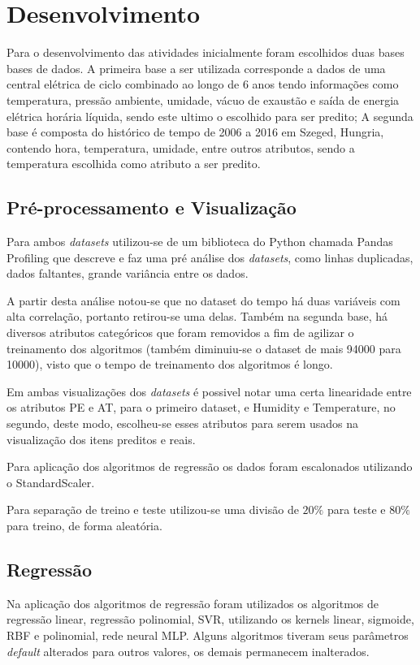 \chapter{Desenvolvimento}\label{cap_desenv}

Para o desenvolvimento das atividades inicialmente foram escolhidos duas bases bases de dados. A primeira base a ser utilizada corresponde a dados de uma central elétrica de ciclo combinado ao longo de 6 anos tendo informações como temperatura, pressão ambiente, umidade, vácuo de exaustão e saída de energia elétrica horária líquida, sendo este ultimo o escolhido para ser predito; A segunda base é composta do histórico de tempo de 2006 a 2016 em Szeged, Hungria, contendo hora, temperatura, umidade, entre outros atributos, sendo a temperatura escolhida como atributo a ser predito.

\section{Pré-processamento e Visualização}
Para ambos \textit{datasets} utilizou-se de um biblioteca do Python chamada Pandas Profiling que descreve e faz uma pré análise dos \textit{datasets}, como linhas duplicadas, dados faltantes, grande variância entre os dados.

A partir desta análise notou-se que no dataset do tempo há duas variáveis com alta correlação, portanto retirou-se uma delas. Também na segunda base, há diversos atributos categóricos que foram removidos a fim de agilizar o treinamento dos algoritmos (também diminuiu-se o dataset de mais 94000 para 10000), visto que o tempo de treinamento dos algoritmos é longo.

Em ambas visualizações dos \textit{datasets} é possivel notar uma certa linearidade entre os atributos PE e AT, para o primeiro dataset, e Humidity e Temperature, no segundo, deste modo, escolheu-se esses atributos para serem usados na visualização dos itens preditos e reais.

Para aplicação dos algoritmos de regressão os dados foram escalonados utilizando o StandardScaler.

Para separação de treino e teste utilizou-se uma divisão de $20\%$ para teste e $80\%$ para treino, de forma aleatória.

\section{Regressão}

Na aplicação dos algoritmos de regressão foram utilizados os algoritmos de regressão linear, regressão polinomial, SVR, utilizando os kernels linear, sigmoide, RBF e polinomial, rede neural MLP. Alguns algoritmos tiveram seus parâmetros \textit{default} alterados para outros valores, os demais permanecem inalterados.


